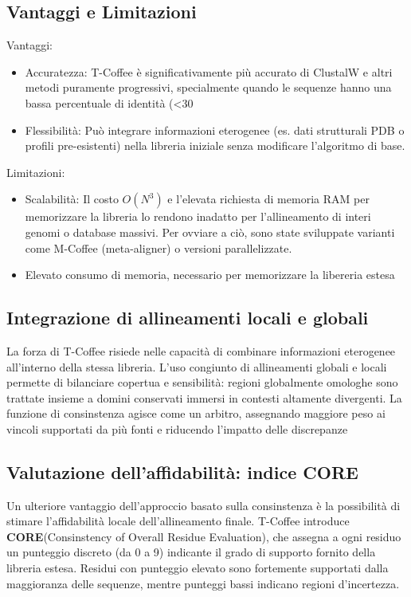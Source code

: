 \subsection{Vantaggi e Limitazioni}
Vantaggi:
\begin{itemize}
    \item Accuratezza: T-Coffee è significativamente più accurato di ClustalW e altri metodi puramente progressivi, specialmente quando le sequenze hanno una bassa percentuale di identità (<30%
    \item Flessibilità: Può integrare informazioni eterogenee (es. dati strutturali PDB o profili pre-esistenti) nella libreria iniziale senza modificare l'algoritmo di base.
\end{itemize}
Limitazioni:
\begin{itemize}
    \item Scalabilità: Il costo $O(N^3)$ e l'elevata richiesta di memoria RAM per memorizzare la libreria lo rendono inadatto per l'allineamento di interi genomi o database massivi. Per ovviare a ciò, sono state sviluppate varianti come M-Coffee (meta-aligner) o versioni parallelizzate.
    \item Elevato consumo di memoria, necessario per memorizzare la libereria estesa
\end{itemize}

\subsection{Integrazione di allineamenti locali e globali}
La forza di T-Coffee risiede nelle capacità di combinare informazioni 
eterogenee all'interno della stessa libreria. L'uso congiunto di allineamenti globali e locali permette di 
bilanciare copertua e sensibilità: regioni globalmente omologhe sono trattate insieme a domini conservati
immersi in contesti altamente divergenti. La funzione di consinstenza agisce come un 
arbitro, assegnando maggiore peso ai vincoli supportati da più fonti e riducendo
l'impatto delle discrepanze

\subsection{Valutazione dell'affidabilità: indice CORE}
Un ulteriore vantaggio dell'approccio basato sulla consinstenza è la possibilità di stimare
l'affidabilità locale dell'allineamento finale.
T-Coffee introduce \textbf{CORE}(Consinstency of Overall Residue Evaluation), che assegna
a ogni residuo un punteggio discreto (da 0 a 9) indicante il grado di supporto fornito della libreria estesa.
Residui con punteggio elevato sono fortemente supportati
dalla maggioranza delle sequenze, mentre punteggi bassi 
indicano regioni d'incertezza.

